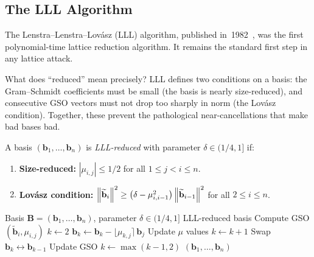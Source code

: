 \subsection{The LLL Algorithm}
\label{subsec:lll}

The Lenstra--Lenstra--Lov\'asz (LLL) algorithm, published in~1982~\cite{LLL1982}, was the first polynomial-time lattice reduction algorithm.  It remains the standard first step in any lattice attack.

What does ``reduced'' mean precisely?  LLL defines two conditions on a basis: the Gram--Schmidt coefficients must be small (the basis is nearly size-reduced), and consecutive GSO vectors must not drop too sharply in norm (the Lov\'asz condition).  Together, these prevent the pathological near-cancellations that make bad bases bad.

\begin{definition}
\label{def:lll-reduced}
A basis $(\mathbf{b}_1,\ldots,\mathbf{b}_n)$ is \emph{LLL-reduced} with parameter $\delta\in(1/4,1]$ if:
\begin{enumerate}
\item \textbf{Size-reduced:} $|\mu_{i,j}| \leq 1/2$ for all $1 \leq j < i \leq n$.
\item \textbf{Lov\'asz condition:} $\left\lVert \widetilde{\mathbf{b}}_i \right\rVert^2 \geq \bigl(\delta - \mu_{i,i-1}^2\bigr)\left\lVert \widetilde{\mathbf{b}}_{i-1} \right\rVert^2$ for all $2 \leq i \leq n$.
\end{enumerate}
\end{definition}

\begin{algorithm}[t]
\caption{The LLL Algorithm}
\label{alg:lll}
\begin{algorithmic}[1]
\Require Basis $\mathbf{B} = (\mathbf{b}_1,\ldots,\mathbf{b}_n)$, parameter $\delta\in(1/4,1]$
\Ensure LLL-reduced basis
\State Compute GSO $(\widetilde{\mathbf{b}}_i, \mu_{i,j})$
\State $k \gets 2$
   
      \State $\mathbf{b}_k \gets \mathbf{b}_k - \lfloor \mu_{k,j}\rceil\,\mathbf{b}_j$
      \State Update $\mu$ values
    \EndIf
  \EndFor
   
    \State $k \gets k + 1$
  \Else
    \State Swap $\mathbf{b}_k \leftrightarrow \mathbf{b}_{k-1}$
    \State Update GSO
    \State $k \gets \max(k-1, 2)$
  \EndIf
\EndWhile
\State \Return $(\mathbf{b}_1,\ldots,\mathbf{b}_n)$
\end{algorithmic}
\end{algorithm}

